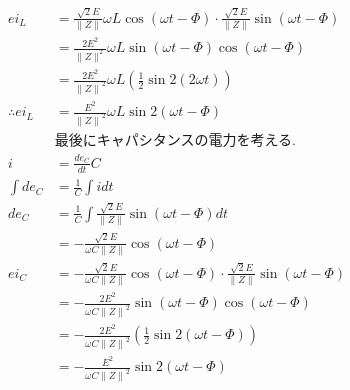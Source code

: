 \documentclass[twocolumn]{article}
\begin{document}
\begin{enumerate}
\begin{align*}
          ei_L            & = \frac{\sqrt{2}E}{\|Z\|}\omega L \cos \left(\omega t - \Phi\right) \cdot \frac{\sqrt{2}E}{\|Z\|}\sin \left( \omega t - \Phi\right) \\
                          & = \frac{2E^2}{{\|Z\|^2}}\omega L \sin \left(\omega t - \Phi\right) \cos \left(\omega t - \Phi\right)                                \\
                          & = \frac{2E^2}{{\|Z\|}^2}\omega L \left(\frac{1}{2}\sin2\left(2\omega t\right)\right)                                                \\
          \therefore ei_L & = \frac{E^2}{{\|Z\|}^2}\omega L \sin2\left(\omega t - \Phi\right)                                                                   \\
                          & \text{最後にキャパシタンスの電力を考える.}                                                                                                           \\
          i               & = \frac{de_C}{dt}C                                                                                                                  \\
          \int de_C       & = \frac{1}{C} \int i dt                                                                                                             \\
          de_C            & = \frac{1}{C} \int \frac{\sqrt{2}E}{\|Z\|}\sin \left(\omega t - \Phi\right) dt                                                      \\
                          & = -\frac{\sqrt{2}E}{\omega C \|Z\|}\cos\left(\omega t - \Phi\right)                                                                 \\
          ei_C            & = -\frac{\sqrt{2}E}{\omega C \|Z\|}\cos\left(\omega t - \Phi\right) \cdot \frac{\sqrt{2}E}{\|Z\|}\sin \left(\omega t - \Phi\right)  \\
                          & = -\frac{2E^2}{\omega C {\|Z\|}^2}\sin\left(\omega t - \Phi\right) \cos \left(\omega t - \Phi\right)                                \\
                          & = -\frac{2E^2}{\omega C {\|Z\|}^2} \left(\frac{1}{2} \sin2\left(\omega t - \Phi\right)\right)                                       \\
                          & = -\frac{E^2}{\omega C {\|Z\|}^2}\sin2\left(\omega t -\Phi\right)                                                                   \\
        \end{align*}



\end{enumerate}
\end{document}
